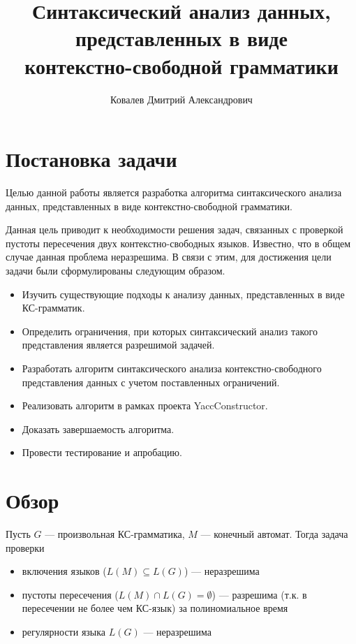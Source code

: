 \documentclass[10pt]{article}
\title{Синтаксический анализ данных, представленных в виде \\ контекстно-свободной грамматики}
\author{Ковалев Дмитрий Александрович}
\date{}
\begin{document}
	\maketitle
	
	\section{Постановка задачи}
		Целью данной работы является разработка алгоритма синтаксического анализа данных, представленных в виде контекстно-свободной грамматики.
		
		Данная цель приводит к необходимости решения задач, связанных с проверкой пустоты пересечения двух контекстно-свободных языков. Известно, что в общем случае данная проблема неразрешима. В связи с этим, для достижения цели задачи были сформулированы следующим образом.
		
		\begin{itemize}
			\item Изучить существующие подходы к анализу данных, представленных в виде КС-грамматик.
			\item Определить ограничения, при которых синтаксический анализ такого представления является разрешимой задачей.
			\item Разработать алгоритм синтаксического анализа контекстно-свободного представления данных с учетом поставленных ограничений.
			\item Реализовать алгоритм в рамках проекта YaccConstructor.
			\item Доказать завершаемость алгоритма.
			\item Провести тестирование и апробацию.
		\end{itemize}
	
	\section{Обзор}
	
	Пусть $G$ --- произвольная КС-грамматика, $M$ --- конечный автомат. Тогда задача проверки
	\begin{itemize}
		\item включения языков ($L(M) \subseteq L(G)$) --- неразрешима
		\item пустоты пересечения ($L(M) \cap L(G) = \emptyset$) --- разрешима (т.к. в пересечении не более чем КС-язык) за полиномиальное время \cite{Hunt}
		\item регулярности языка $L(G)$ --- неразрешима \cite{Greibach1968}
	\end{itemize} 
	
\end{document}
